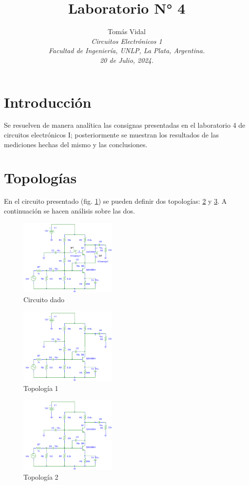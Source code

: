 \documentclass[letterpaper, 10 pt, conference]{ieeeconf}  %
\title{\LARGE \bf Laboratorio N° 4}
\author{
  Tom\'as Vidal\\
  {\it Circuitos Electrónicos 1}\\
  {\it Facultad de Ingenier\'ia, UNLP, La Plata, Argentina.}\\
  {\it 20 de Julio, 2024.}
}                                            %
\begin{document}
\maketitle
\thispagestyle{empty}
\pagestyle{empty}

\section{Introducción}
Se resuelven de manera analítica las consignas presentadas en el laboratorio 4 de circuitos electrónicos I; posteriormente se muestran los resultados de las mediciones hechas del mismo y las conclusiones.

\section{Topologías}
En el circuito presentado (fig. \ref{pic:circuito_presentado}) se pueden definir dos topologías: \ref{pic:topologia1} y \ref{pic:topologia2}. A continuación se hacen análisis sobre las dos.

\begin{figure}[H]
 \centering
 \includegraphics[width=0.43\textwidth]{./Imagenes/circuito_presentado.png}
 \caption{Circuito dado}
 \label{pic:circuito_presentado}
\end{figure}

\begin{figure}[H]
 \centering
 \includegraphics[width=0.43\textwidth]{./Imagenes/topologia1.png}
 \caption{Topología 1}
 \label{pic:topologia1}
\end{figure}

\begin{figure}[H]
 \centering
 \includegraphics[width=0.43\textwidth]{./Imagenes/topologia2.png}
 \caption{Topología 2}
 \label{pic:topologia2}
\end{figure}
\end{document}
